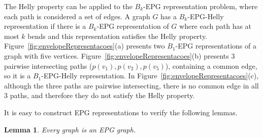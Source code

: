 \documentclass[9pt]{entcs}
\newtheorem{lema}{Lemma}[section]
\newtheorem{prove}{Proof}[section]
\begin{document}
The Helly property can be applied to the $ B_k $-EPG representation problem, where each path is considered a set of edges. A graph $ G $ has a  $ B_k$-EPG-Helly representation if there is a $ B_k $-EPG representation of $G$ where each path has at most $ k $ bends and this representation satisfies the Helly property. %
 Figure~\ref{fig:envelopeRepresentacoes}(a) presents two $B_1$-EPG representations of a graph with five vertices.  Figure~\ref{fig:envelopeRepresentacoes}(b)   presents 3 pairwise intersecting paths ($p(v_1), p(v_2), p(v_5)$), containing a common edge, so it is a $ B_1$-EPG-Helly representation. In Figure~\ref{fig:envelopeRepresentacoes}(c), although the three paths are pairwise intersecting, there is no common edge in all 3 paths, and therefore they do not satisfy the Helly property. 





 
 It is easy to construct EPG representations to verify the following lemmas.
 
 \begin{lema} \cite{golumbic2009} \label{lem:todoGrafoEpg}
 Every graph is an EPG graph.
 \end{lema}
 
 
\end{document}
